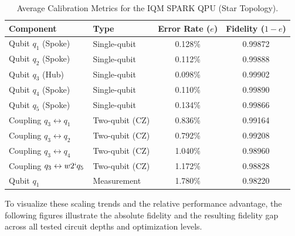 \documentclass[11pt]{article}
\begin{document}
\begin{table}[htbp]
\centering
\caption{Average Calibration Metrics for the IQM SPARK QPU (Star Topology).}
\label{tab:calibration_metrics}
\begin{tabular}{llcc}
\toprule
\textbf{Component} & \textbf{Type} & \textbf{Error Rate ($e$)} & \textbf{Fidelity ($1-e$)} \\
\midrule
Qubit $q_1$ (Spoke) & Single-qubit & 0.128\% & 0.99872 \\
Qubit $q_2$ (Spoke) & Single-qubit & 0.112\% & 0.99888 \\
Qubit $q_3$ (Hub)   & Single-qubit & 0.098\% & 0.99902 \\
Qubit $q_4$ (Spoke) & Single-qubit & 0.110\% & 0.99890 \\
Qubit $q_5$ (Spoke) & Single-qubit & 0.134\% & 0.99866 \\
\midrule
Coupling $q_3 \leftrightarrow q_1$ & Two-qubit (CZ) & 0.836\% & 0.99164 \\
Coupling $q_3 \leftrightarrow q_2$ & Two-qubit (CZ) & 0.792\% & 0.99208 \\
Coupling $q_3 \leftrightarrow q_4$ & Two-qubit (CZ) & 1.040\% & 0.98960 \\
Coupling $q_3 \leftrightarrow  w2`                                           q_5$ & Two-qubit (CZ) & 1.172\% & 0.98828 \\
\midrule
Qubit $q_1$ & Measurement & 1.780\% & 0.98220 \\
\bottomrule
\end{tabular}
\end{table}

To visualize these scaling trends and the relative performance advantage, the following figures illustrate the absolute fidelity and the resulting fidelity gap across all tested circuit depths and optimization levels.
\end{document}
